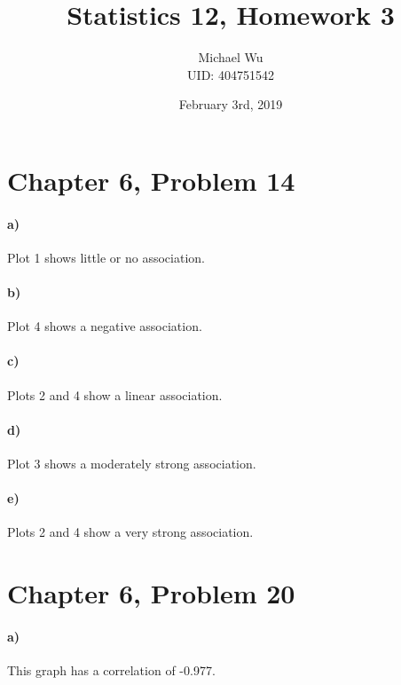\documentclass[12pt]{article}
\begin{document}
\title{Statistics 12, Homework 3}
\date{February 3rd, 2019}
\author{Michael Wu\\UID: 404751542}
\maketitle

\section*{Chapter 6, Problem 14}

\paragraph{a)}

Plot 1 shows little or no association.

\paragraph{b)}

Plot 4 shows a negative association.

\paragraph{c)}

Plots 2 and 4 show a linear association.

\paragraph{d)}

Plot 3 shows a moderately strong association.

\paragraph{e)}

Plots 2 and 4 show a very strong association.

\section*{Chapter 6, Problem 20}

\paragraph{a)}

This graph has a correlation of -0.977.
\end{document}
